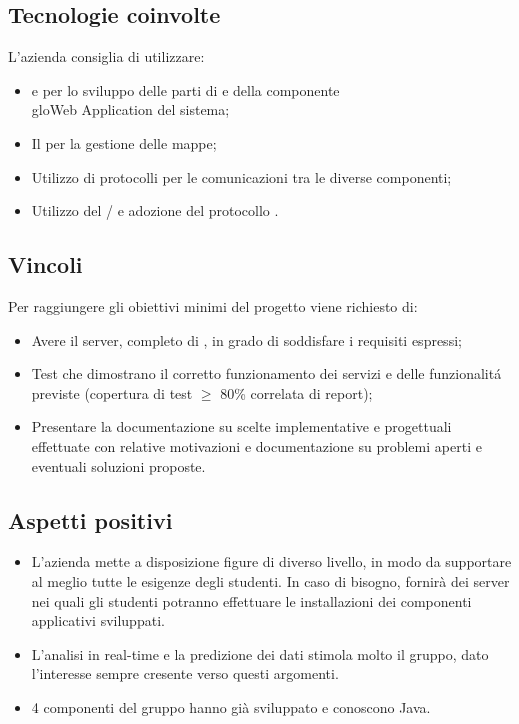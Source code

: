 \subsection{Tecnologie coinvolte}
L'azienda consiglia di utilizzare:
\begin{itemize}
	\item {} e  per lo sviluppo delle parti di  e  della componente \\glo{Web Application} del sistema;
	\item Il   per la gestione delle mappe;
	\item Utilizzo di protocolli  per le comunicazioni tra le diverse componenti;
	\item Utilizzo del  / e adozione del protocollo . 
\end{itemize}

\subsection{Vincoli}
Per raggiungere gli obiettivi minimi del progetto viene richiesto di:
\begin{itemize}
	\item Avere il server, completo di , in grado di soddisfare i requisiti espressi;
	\item Test che dimostrano il corretto funzionamento dei servizi e delle funzionalit\'a previste (copertura di test $\geq$ 80\% correlata di report);
	\item Presentare la documentazione su scelte implementative e progettuali effettuate con relative motivazioni e documentazione su problemi aperti e eventuali soluzioni proposte.
\end{itemize}

\subsection{Aspetti positivi}
\begin{itemize}
	\item L'azienda mette a disposizione figure di diverso livello, in modo da supportare al meglio tutte le esigenze degli studenti. In caso di bisogno, fornirà dei server nei quali gli studenti potranno effettuare le installazioni dei componenti applicativi sviluppati.
	\item L'analisi in real-time e la predizione dei dati stimola molto il gruppo, dato l'interesse sempre cresente verso questi argomenti. 
	\item 4 componenti del gruppo hanno già sviluppato e conoscono Java.
\end{itemize}

